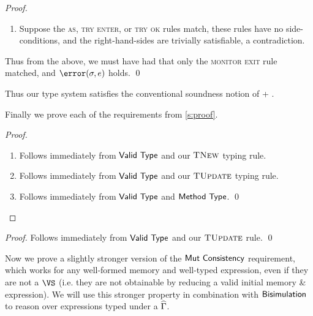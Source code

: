 \begin{proof}
\begin{enumerate}
		\item Suppose the \textsc{as}, \textsc{try enter}, or \textsc{try ok} rules match, these rules have no side-conditions, and the right-hand-sides are trivially satisfiable, a contradiction.
	\end{enumerate}
	
	Thus from the above, we must have had that only the \textsc{monitor exit} rule matched, and $\error(\s, e)$ holds.
\qed\end{proof}

Thus our type system satisfies the conventional soundness notion of  + .


Finally we prove each of the requirements from \autoref{s:proof}.

\setcounter{requirement}{0}
\SS\REQTypeCons
\SS\begin{proof}
	\SS\begin{enumerate}
		\item Follows immediately from $\textsf{Valid Type}$ and our $\textsc{TNew}$
		typing rule.
		\item Follows immediately from $\textsf{Valid Type}$ and our $\textsc{TUpdate}$
		typing rule.
		\item Follows immediately from $\textsf{Valid Type}$ and $\textsf{Method Type}$.
	\qed\end{enumerate}
\end{proof}

\setcounter{requirement}{4}
\SS\REQMutUpd
\SS\begin{proof}
	Follows immediately from $\textsf{Valid Type}$ and our $\textsc{TUpdate}$
	rule.
\qed\end{proof}

Now we prove a slightly stronger version of the $\textsf{Mut Consistency}$
requirement, which works for any well-formed memory and well-typed
expression, even if they are not a $\VS$ (i.e. they are not obtainable
by reducing a valid initial memory \& expression). We will use this
stronger property in combination with $\textsf{Bisimulation}$ to reason
over expressions typed under a $\widehat{\Gamma}$.

